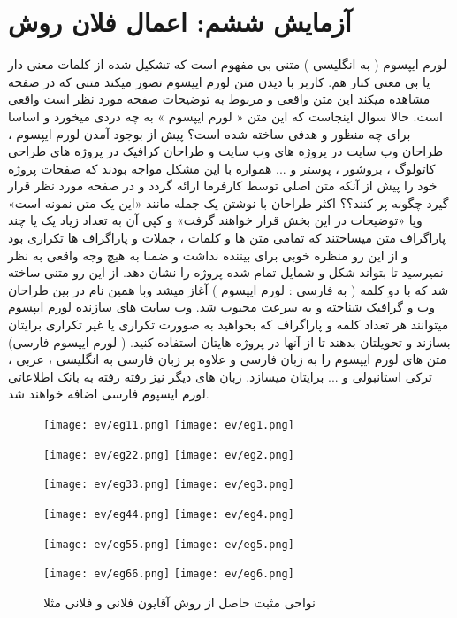 \section{آزمایش ششم: اعمال فلان روش}
لورم ایپسوم ( به انگلیسی  ) متنی بی مفهوم است که تشکیل شده از کلمات معنی دار یا بی معنی کنار هم. کاربر با دیدن متن لورم ایپسوم تصور میکند متنی که در صفحه مشاهده میکند این متن واقعی و مربوط به توضیحات صفحه مورد نظر است واقعی است. حالا سوال اینجاست که این متن « لورم ایپسوم » به چه دردی میخورد و اساسا برای چه منظور و هدفی ساخته شده است؟ پیش از بوجود آمدن لورم ایپسوم ، طراحان وب سایت در پروژه های وب سایت و طراحان کرافیک در پروژه های طراحی کاتولوگ ، بروشور ، پوستر و ... همواره با این مشکل مواجه بودند که صفحات پروژه خود را پیش از آنکه متن اصلی توسط کارفرما ارائه گردد و در صفحه مورد نظر قرار گیرد چگونه پر کنند؟؟ اکثر طراحان با نوشتن یک جمله مانند «این یک متن نمونه است» ویا «توضیحات در این بخش قرار خواهند گرفت» و کپی آن به تعداد زیاد یک یا چند پاراگراف متن میساختند که تمامی متن ها و کلمات ، جملات و پاراگراف ها تکراری بود و از این رو منظره خوبی برای بیننده نداشت و ضمنا به هیچ وجه واقعی به نظر نمیرسید تا بتواند شکل و شمایل تمام شده پروژه را نشان دهد. از این رو متنی ساخته شد که با دو کلمه ( به فارسی : لورم ایپسوم ) آغاز میشد وبا همین نام در بین طراحان وب و گرافیک شناخته و به سرعت محبوب شد. وب سایت های سازنده لورم ایپسوم میتوانند هر تعداد کلمه و پاراگراف که بخواهید به صوورت تکراری یا غیر تکراری برایتان بسازند و تحویلتان بدهند تا از آنها در پروژه هایتان استفاده کنید. ( لورم ایپسوم فارسی) متن های لورم ایپسوم را به زبان فارسی و علاوه بر زبان فارسی به انگلیسی ، عربی ، ترکی استانبولی و ... برایتان میسازد. زبان های دیگر نیز رفته رفته به بانک اطلاعاتی لورم ایسپوم فارسی اضافه خواهند شد.  

\begin{figure}[H]
\centering     %
\texttt{[image: ev/eg11.png]}
\hspace{-2mm}
\texttt{[image: ev/eg1.png]}

\texttt{[image: ev/eg22.png]}
\hspace{-2mm}
\texttt{[image: ev/eg2.png]}


\texttt{[image: ev/eg33.png]}
\hspace{-2mm}
\texttt{[image: ev/eg3.png]}


\texttt{[image: ev/eg44.png]}
\hspace{-2mm}
\texttt{[image: ev/eg4.png]}


\texttt{[image: ev/eg55.png]}
\hspace{-2mm}
\texttt{[image: ev/eg5.png]}


\texttt{[image: ev/eg66.png]}
\hspace{-2mm}
\texttt{[image: ev/eg6.png]}

\caption[نواحی مثبت حاصل از فلان]
{نواحی مثبت حاصل از روش آقایون فلانی و فلانی مثلا}
\label{fig:evegbisreg}
\end{figure}


